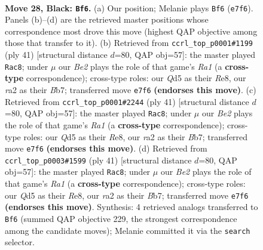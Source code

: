 \documentclass[11pt]{article}
\begin{document}
\clearpage

\begin{figure}[p]\centering
\begin{subfigure}{0.46\textwidth}\centering
\resizebox{\linewidth}{!}{%
\newchessgame
\chessboard[
  setfen={1rb2rk1/p2nb2p/8/2pq4/Pp1p1P2/1P4N1/R1Q1PK2/1NBR4 b - - 3 28},
  showmover=false,
  pgfstyle=straightmove, color=movearrow, markmove={e7-f6}
]}
\caption{}
\end{subfigure}\hfill
\begin{subfigure}{0.46\textwidth}\centering
\resizebox{\linewidth}{!}{%
\newchessgame
\chessboard[
  setfen={r3r1k1/pb2pp1p/1nq3p1/8/2p5/2N1QPP1/PPPRB2P/2K4R b - - 3 21},
  showmover=false,
  pgfstyle=straightmove, color=movearrow, markmove={a8-c8}
]}
\caption{}
\end{subfigure}
\\[4pt]
\begin{subfigure}{0.46\textwidth}\centering
\resizebox{\linewidth}{!}{%
\newchessgame
\chessboard[
  setfen={r3r1k1/pb2pp1p/1nq3p1/8/2p5/2N1QPP1/PPPRB2P/2K4R b - - 3 21},
  showmover=false,
  pgfstyle=straightmove, color=movearrow, markmove={a8-c8}
]}
\caption{}
\end{subfigure}\hfill
\begin{subfigure}{0.46\textwidth}\centering
\resizebox{\linewidth}{!}{%
\newchessgame
\chessboard[
  setfen={r3r1k1/pb2pp1p/1nq3p1/8/2p5/2N1QPP1/PPPRB2P/2K4R b - - 3 21},
  showmover=false,
  pgfstyle=straightmove, color=movearrow, markmove={a8-c8}
]}
\caption{}
\end{subfigure}
\caption{\textbf{Move 28, Black: \texttt{Bf6}.} (a) Our position; Melanie plays \texttt{Bf6} (\texttt{e7f6}). Panels (b)--(d) are the retrieved master positions whose correspondence most drove this move (highest QAP objective among those that transfer to it). (b) Retrieved from \texttt{ccrl\_top\_p0001\#1199} (ply 41) [structural distance $d$=80, QAP obj=57]: the master played \texttt{Rac8}; under $\mu$ our \emph{Be2} plays the role of that game's \emph{Ra1} (a \textbf{cross-type} correspondence); cross-type roles: our \emph{Q}d5 as their \emph{R}e8, our \emph{r}a2 as their \emph{B}b7; transferred move \texttt{e7f6} \textbf{(endorses this move)}. (c) Retrieved from \texttt{ccrl\_top\_p0001\#2244} (ply 41) [structural distance $d$=80, QAP obj=57]: the master played \texttt{Rac8}; under $\mu$ our \emph{Be2} plays the role of that game's \emph{Ra1} (a \textbf{cross-type} correspondence); cross-type roles: our \emph{Q}d5 as their \emph{R}e8, our \emph{r}a2 as their \emph{B}b7; transferred move \texttt{e7f6} \textbf{(endorses this move)}. (d) Retrieved from \texttt{ccrl\_top\_p0003\#1599} (ply 41) [structural distance $d$=80, QAP obj=57]: the master played \texttt{Rac8}; under $\mu$ our \emph{Be2} plays the role of that game's \emph{Ra1} (a \textbf{cross-type} correspondence); cross-type roles: our \emph{Q}d5 as their \emph{R}e8, our \emph{r}a2 as their \emph{B}b7; transferred move \texttt{e7f6} \textbf{(endorses this move)}. Synthesis: 4 retrieved analogs transferred to \texttt{Bf6} (summed QAP objective 229, the strongest correspondence among the candidate moves); Melanie committed it via the \texttt{search} selector.}
\label{fig:thought-m55}
\end{figure}
\end{document}
